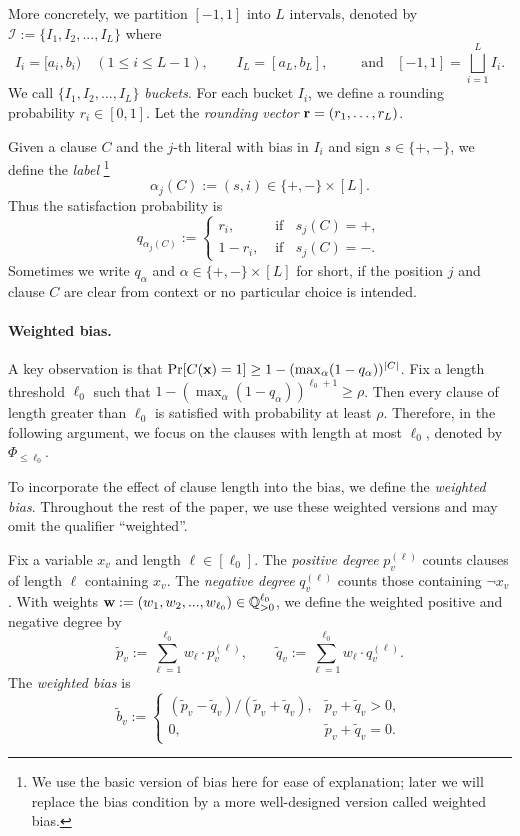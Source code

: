 More concretely, we partition  $[-1,1]$ into $L$ intervals, denoted by $\mathcal{I}:= \{I_1,I_2,...,I_L\}$ where  \[
  I_i=[a_i,b_i)\quad(1\le i\le L-1),\qquad 
  I_{L}=[a_{L},b_{L}],
  \qquad \text{ and }\;\; [-1,1]=\bigsqcup_{i=1}^{L} I_{i}.
\]
We call $\{I_1,I_2,...,I_L\}$ \textit{buckets}. For each bucket $I_{i}$, we define a rounding probability $r_i\in [0,1]$. Let the \textit{rounding vector} $\mathbf{r}= (r_1,\ldots,r_L)$. 




Given a clause $C$ and the $j$-th literal with bias  in $I_i$ and sign $s\in \{+,-\}$, we define the \textit{label} \footnote{We use the basic version of bias here for ease of explanation; later we will replace the bias condition by a more well-designed version called  weighted bias.} $$\alpha_{j} (C) := (s,i)\in \{+,-\}\times [L].$$ Thus  the satisfaction probability is \[
q_{\alpha_{j}(C)} := \begin{cases}
    r_{i},& \text{ if }\;\; s_{j}(C)=+,\\
    1-r_{i},& \text{ if }\;\; s_{j}(C)=-.
\end{cases}
\]
Sometimes we write $q_{\alpha}$ and  $\alpha\in \{+,-\}\times [L]$ for short, if the position $j$ and clause $C$ are clear from context or no particular choice is intended.


\paragraph{Weighted bias.}
A key observation is that $\Pr[C(\mathbf{x})=1]\ge1-(\max_\alpha(1-q_\alpha))^{|C|}$. Fix a length threshold $\ell_0$ such that $1-(\max_\alpha(1-q_\alpha))^{\ell_0+1}\ge\rho$. Then every clause of length greater than $\ell_0$ is satisfied with probability at least $\rho$. 
Therefore, in the following argument, we focus on the  clauses with length at most $\ell_0$, denoted by $\Phi_{\le \ell_0}$. 




To incorporate the effect of clause length into the bias, we define the \textit{weighted bias}. Throughout the rest of the paper, we use these weighted versions and may omit the qualifier ``weighted''.

\begin{definition}
\label{def:maxksat-bias}
Fix a variable $x_v$ and  length $\ell\in [\ell_0]$. The \textit{positive degree} $p_v^{(\ell)}$ counts clauses of length $\ell$ containing $x_v$. The \textit{negative degree} $q_v^{(\ell)}$ counts those containing $\neg x_v$. With weights $\mathbf{w} := (w_1,w_2,...,w_{\ell_0})\in\mathbb Q_{>0}^{\ell_0}$, we define the weighted positive and negative  degree by 
\[
   \widetilde{p }_v:= \sum_{\ell=1}^{\ell_0} w_{\ell}\cdot p_{v}^{(\ell)}  ,\qquad
  \widetilde q_v:= \sum_{\ell=1}^{\ell_0} w_{\ell}\cdot q_{v}^{(\ell)}. 
\]
The \textit{weighted bias} is
\[
  \widetilde b_v:=\begin{cases}
    ( \widetilde p_v-  \widetilde q_v)/( \widetilde p_v+ \widetilde q_v),& \widetilde p_v+ \widetilde q_v>0,\\
    0,& \widetilde p_v+ \widetilde q_v=0.
  \end{cases}
\]
\end{definition}

